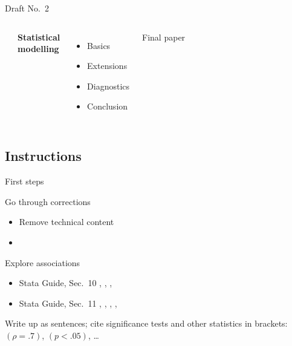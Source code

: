\documentclass[t]{beamer}
\begin{document}
\begin{frame}[t]{Draft No.~2}
\begin{columns}[T]
			\begin{center}
				\\[.5em]
			\end{center}
		

			\textbf{Statistical\\modelling}
	
			\begin{itemize}
				\item Basics
				\item Extensions
				\item Diagnostics
				\item Conclusion
			\end{itemize}

			\begin{center}
				Final paper\\[.5em]
			\end{center}
			
	\end{columns}
		
	\end{frame}

	\subsection{Instructions}

	\begin{frame}[t]{First steps}

	\begin{block}{Go through corrections}
	
		\begin{itemize}
			\item Remove technical content
			\item {}
		\end{itemize}

	\end{block}
	
	\begin{block}{Explore associations}

		\begin{itemize}
			\item Stata Guide, Sec.~10 \hfill%
				, , , 
			\item Stata Guide, Sec.~11 \hfill%
				, , , , 
		\end{itemize}
		
		Write up  as sentences; %
		cite significance tests and other statistics in brackets: %
		$(\rho = .7)$, $(p < .05)$, …
			
	\end{block}

	\end{frame}
\end{document}
